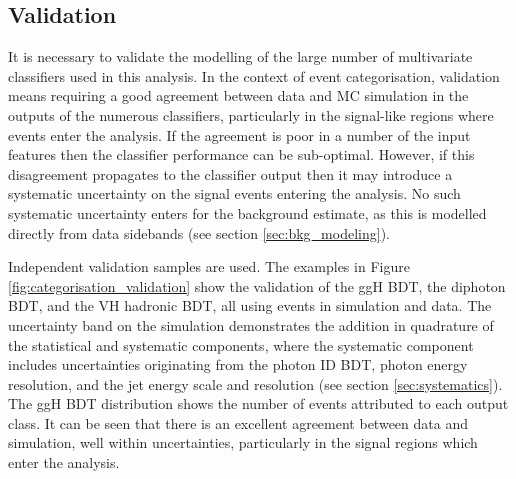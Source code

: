 \FloatBarrier

\subsection{Validation}
It is necessary to validate the modelling of the large number of multivariate classifiers used in this analysis. In the context of event categorisation, validation means requiring a good agreement between data and MC simulation in the outputs of the numerous classifiers, particularly in the signal-like regions where events enter the analysis. If the agreement is poor in a number of the input features then the classifier performance can be sub-optimal. However, if this disagreement propagates to the classifier output then it may introduce a systematic uncertainty on the signal events entering the analysis. No such systematic uncertainty enters for the background estimate, as this is modelled directly from data sidebands (see section \ref{sec:bkg_modeling}).

Independent validation samples are used. The examples in Figure \ref{fig:categorisation_validation} show the validation of the ggH BDT, the diphoton BDT, and the VH hadronic BDT, all using \Zee events in simulation and data. The uncertainty band on the simulation demonstrates the addition in quadrature of the statistical and systematic components, where the systematic component includes uncertainties originating from the photon ID BDT, photon energy resolution, and the jet energy scale and resolution (see section \ref{sec:systematics}). The ggH BDT distribution shows the number of events attributed to each output class. It can be seen that there is an excellent agreement between data and simulation, well within uncertainties, particularly in the signal regions which enter the analysis.

